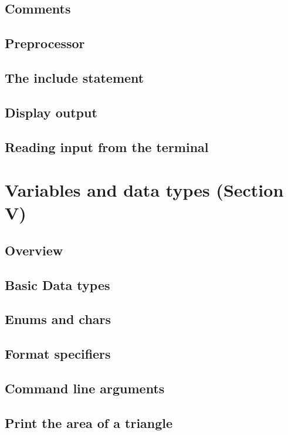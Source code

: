 \documentclass{book}
\begin{document}
\section{Comments}


\section{Preprocessor}


\section{The include statement}


\section{Display output}


\section{Reading input from the terminal}


\chapter{Variables and data types (Section V)}
\section{Overview}


\section{Basic Data types}


\section{Enums and chars}


\section{Format specifiers}


\section{Command line arguments}


\section{Print the area of a triangle}

\end{document}
